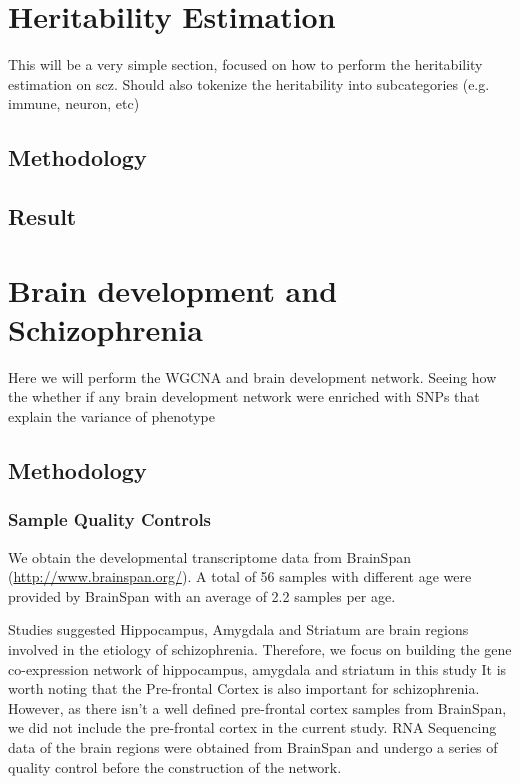 \documentclass{book}
\begin{document}
	\section{Heritability Estimation}
	This will be a very simple section, focused on how to perform the heritability estimation on \acrfull{scz}.
	Should also tokenize the heritability into subcategories (e.g. immune, neuron, etc)
	
	
	\subsection{Methodology}
	\subsection{Result}
	\section{Brain development and Schizophrenia}
	Here we will perform the WGCNA and brain development network.
	Seeing how the whether if any brain development network were enriched with SNPs that explain the variance of phenotype
	\subsection{Methodology}
	\subsubsection{Sample Quality Controls}
	We obtain the developmental transcriptome data from BrainSpan (\url{http://www.brainspan.org/}). 
	A total of 56 samples with different age were provided by BrainSpan with an average of 2.2 samples per age.
	
	Studies suggested Hippocampus\citep{Velakoulis2006,Nugent2007}, Amygdala and Striatum\citep{Simpson2010} are brain regions involved in the etiology of schizophrenia. 
	Therefore, we focus on building the gene co-expression network of hippocampus, amygdala and striatum in this study
	It is worth noting that the Pre-frontal Cortex is also important for schizophrenia. 
	However, as there isn't a well defined pre-frontal cortex samples from BrainSpan, we did not include the pre-frontal cortex in the current study.
	RNA Sequencing data of the brain regions were obtained from BrainSpan and undergo a series of quality control before the construction of the network. 
	 
\end{document}
